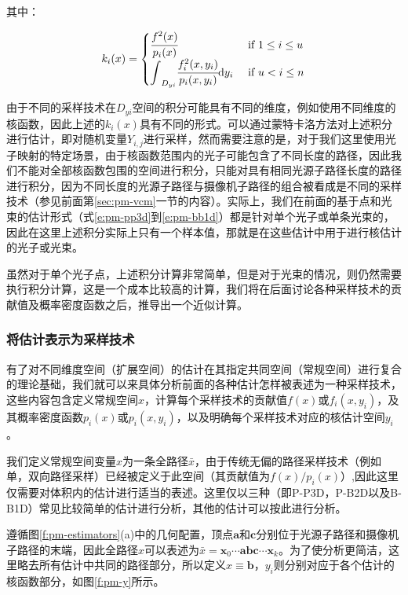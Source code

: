 \noindent 其中：

\begin{equation}
	k_i(x)=\begin{cases}
		\mathlarger{ \cfrac{f^{2}(x)}{p_i(x)}} & \text{ if } 1\leq i\leq u\\
		\mathlarger{{\rm \int}_{D_{yi}} \cfrac{f^{2}_i(x,y_i)}{p_i(x,y_i)}{\rm d}y_i} & \text{ if } u<i\leq n
	\end{cases}
\end{equation}

由于不同的采样技术在$D_{yi}$空间的积分可能具有不同的维度，例如使用不同维度的核函数，因此上述的$k_i(x)$具有不同的形式。可以通过蒙特卡洛方法对上述积分进行估计，即对随机变量$Y_{i,j}$进行采样，然而需要注意的是，对于我们这里使用光子映射的特定场景，由于核函数范围内的光子可能包含了不同长度的路径，因此我们不能对全部核函数包围的空间进行积分，只能对具有相同光源子路径长度的路径进行积分，因为不同长度的光源子路径与摄像机子路径的组合被看成是不同的采样技术（参见前面第\ref{sec:pm-vcm}一节的内容）。实际上，我们在前面的基于点和光束的估计形式（式\ref{e:pm-pp3d}到\ref{e:pm-bb1d}）都是针对单个光子或单条光束的，因此在这里上述积分实际上只有一个样本值，那就是在这些估计中用于进行核估计的光子或光束。

虽然对于单个光子点，上述积分计算非常简单，但是对于光束的情况，则仍然需要执行积分计算，这是一个成本比较高的计算，我们将在后面讨论各种采样技术的贡献值及概率密度函数之后，推导出一个近似计算。





\subsubsection{将估计表示为采样技术}
有了对不同维度空间（扩展空间）的估计在其指定共同空间（常规空间）进行复合的理论基础，我们就可以来具体分析前面的各种估计怎样被表述为一种采样技术，这些内容包含定义常规空间$x$，计算每个采样技术的贡献值$f(x)$或$f_i(x,y_i)$，及其概率密度函数$p_i(x)$或$p_i(x,y_i)$，以及明确每个采样技术对应的核估计空间$y_i$。

我们定义常规空间变量$x$为一条全路径$\bar{x}$，由于传统无偏的路径采样技术（例如单，双向路径采样）已经被定义于此空间（其贡献值为$f(x)/p_i(x)$）,因此这里仅需要对体积内的估计进行适当的表述。这里仅以三种（即P-P3D，P-B2D以及B-B1D）常见比较简单的估计进行分析，其他的估计可以按此进行分析。


遵循图\ref{f:pm-estimators}(a)中的几何配置，顶点$\mathbf{a}$和$\mathbf{c}$分别位于光源子路径和摄像机子路径的末端，因此全路径$x$可以表述为$\bar{x}=\mathbf{x}_0\cdots\mathbf{a}\mathbf{b}\mathbf{c}\cdots\mathbf{x}_k$。为了使分析更简洁，这里略去所有估计中共同的路径部分，所以定义$x\equiv \mathbf{b}$，$y_i$则分别对应于各个估计的核函数部分，如图\ref{f:pm-y}所示。

